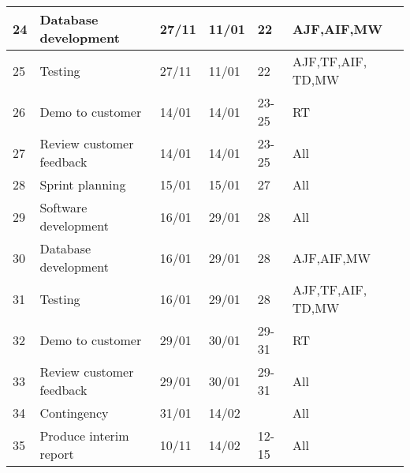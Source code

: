 \begin{longtable}{ | l | l | l | l | l | l | }
24 & Database development & 27/11 & 11/01 & 22 & AJF,AIF,MW \\ \hline
25 & Testing & 27/11 & 11/01 & 22 & AJF,TF,AIF, TD,MW \\ \hline
26 & Demo to customer & 14/01 & 14/01 & 23-25 & RT \\ \hline
27 & Review customer feedback & 14/01 & 14/01 & 23-25 & All \\ \hline
\hline
28 & Sprint planning & 15/01 & 15/01 & 27 & All \\ \hline
29 & Software development & 16/01 & 29/01 & 28 & All \\ \hline
30 & Database development & 16/01 & 29/01 & 28 & AJF,AIF,MW \\ \hline
31 & Testing & 16/01 & 29/01 & 28 & AJF,TF,AIF, TD,MW \\ \hline
32 & Demo to customer & 29/01 & 30/01 & 29-31 & RT \\ \hline
33 & Review customer feedback & 29/01 & 30/01 & 29-31 & All \\ \hline
\hline
34 & Contingency & 31/01 & 14/02 & & All \\ \hline
35 & Produce interim report & 10/11 & 14/02 & 12-15 & All \\ \hline
\end{longtable}